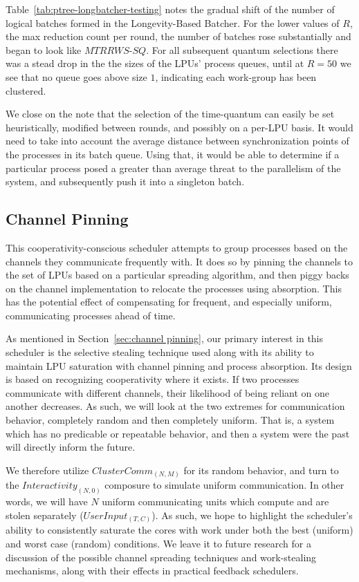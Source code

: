 Table~\ref{tab:ptree-longbatcher-testing} notes the gradual shift of the number of 
logical batches formed in the Longevity-Based Batcher. For the lower values of 
$R$, the max reduction count per round, the number of batches rose substantially and
began to look like $MTRRWS$-$SQ$. For all subsequent quantum selections there was
a stead drop in the the sizes of the LPUs' process queues, until at $R=50$ we 
see that no queue goes above size $1$, indicating each work-group has been clustered.

We close on the note that the selection of the time-quantum can easily be set 
heuristically, modified between rounds, and possibly on a per-LPU basis. It would
need to take into account the average distance between synchronization points
of the processes in its batch queue. Using that, it would be able to determine if
a particular process posed a greater than average threat to the parallelism of the 
system, and subsequently push it into a singleton batch.

\subsection{Channel Pinning}\label{sec:results-channelpinner}

This cooperativity-conscious scheduler attempts to group processes based on the 
channels they communicate frequently with. It does so by pinning the channels to
the set of LPUs based on a particular spreading algorithm, and then piggy backs
on the channel implementation to relocate the processes using absorption. This 
has the potential effect of compensating for frequent, and especially uniform,
communicating processes ahead of time.

As mentioned in Section~\ref{sec:channel pinning}, our primary interest in this 
scheduler is the selective stealing technique used along with its ability to 
maintain LPU saturation with channel pinning and process absorption. Its design 
is based on recognizing cooperativity where it exists. If two processes communicate
with different channels, their likelihood of being reliant on one another decreases.
As such, we will look at the two extremes for communication behavior, completely random 
and then completely uniform. That is, a system which has no predicable or
repeatable behavior, and then a system were the past will directly inform the future. 

We therefore utilize $ClusterComm_{(N,M)}$ for its random behavior, and turn to the 
$Interactivity_{(N,0)}$ composure to simulate uniform communication. In other words,
we will have $N$ uniform communicating units which compute and are stolen separately 
($UserInput_{(T,C)}$). As such, we hope to highlight the scheduler's ability to 
consistently saturate the cores with work under both the best (uniform) and worst
case (random) conditions. We leave it to future research for a discussion of the 
possible channel spreading techniques and work-stealing mechanisms, along with their
effects in practical feedback schedulers.


